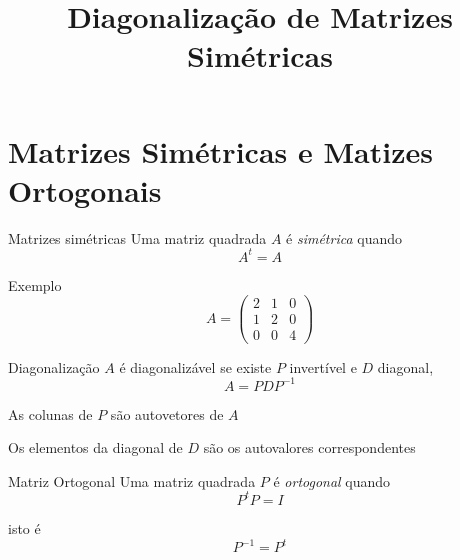 \documentclass[fleqn,aspectratio=169,12pt]{beamer}
\title{Diagonalização de Matrizes Simétricas}
\begin{document}
\addtitle

\section{Matrizes Simétricas e Matizes Ortogonais}

\begin{frame}{Matrizes simétricas}
  Uma matriz quadrada $A$ é \emph{simétrica} quando
  \[
      A^t = A
  \]

  \pause
  Exemplo
  \[
    A =
    \begin{pmatrix}
        2 & 1 & 0\\
        1 & 2 & 0\\
        0 & 0 & 4
    \end{pmatrix}
  \]
\end{frame}

\begin{frame}{Diagonalização}
  $A$ é diagonalizável se existe $P$ invertível e $D$ diagonal,
  \pause
  \[
    A = P D P^{-1}
  \]

  \pause
  \bigskip
  As colunas de $P$ são autovetores de $A$

  \pause
  \bigskip
  Os elementos da diagonal de $D$ são os autovalores correspondentes
\end{frame}

\begin{frame}{Matriz Ortogonal}
  Uma matriz quadrada $P$ é \emph{ortogonal} quando
  \[
    P^t P = I
  \]

  \pause
  isto é
  \[
    P^{-1} = P^t
  \]
\end{frame}
\end{document}
